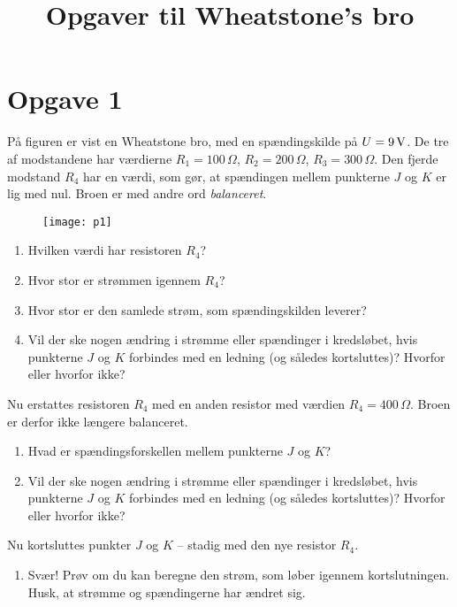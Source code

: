 \documentclass[12pt,oneside,a4paper]{article}
\title{Opgaver til Wheatstone's bro}
\date{\vspace{-5ex}}
\theoremstyle{plain}
\begin{document}
\maketitle

\section*{Opgave 1}

På figuren er vist en Wheatstone bro, med en spændingskilde på $U=9 \,{\rm
V}$.  De tre af modstandene har værdierne $R_1 = 100 \,\Omega$, $R_2 = 200
\,\Omega$, $R_3 = 300 \,\Omega$. Den fjerde modstand $R_4$ har en værdi, som
gør, at spændingen mellem punkterne $J$ og $K$ er lig med nul. Broen er med
andre ord {\em balanceret}.

\begin{figure}[H]
    \centering
    \texttt{[image: p1]}
\end{figure}

\begin{enumerate}[label=(\alph*)]
    \item Hvilken værdi har resistoren $R_4$?
    \item Hvor stor er strømmen igennem $R_4$?
    \item Hvor stor er den samlede strøm, som spændingskilden leverer?
    \item Vil der ske nogen ændring i strømme eller spændinger i kredsløbet,
        hvis punkterne $J$ og $K$ forbindes med en ledning (og således
        kortsluttes)? Hvorfor eller hvorfor ikke?
\end{enumerate}

Nu erstattes resistoren $R_4$ med en anden resistor med værdien
$R_4=400\,\Omega$. Broen er derfor ikke længere balanceret.

\begin{enumerate}[label=(\alph*), resume]
    \item Hvad er spændingsforskellen mellem punkterne $J$ og $K$?
    \item Vil der ske nogen ændring i strømme eller spændinger i kredsløbet,
        hvis punkterne $J$ og $K$ forbindes med en ledning (og således
        kortsluttes)? Hvorfor eller hvorfor ikke?
\end{enumerate}

Nu kortsluttes punkter $J$ og $K$ -- stadig med den nye resistor $R_4$.
\begin{enumerate}[label=(\alph*), resume]
    \item Svær! Prøv om du kan beregne den strøm, som løber igennem
        kortslutningen. Husk, at strømme og spændingerne har ændret sig.
\end{enumerate}
\end{document}

